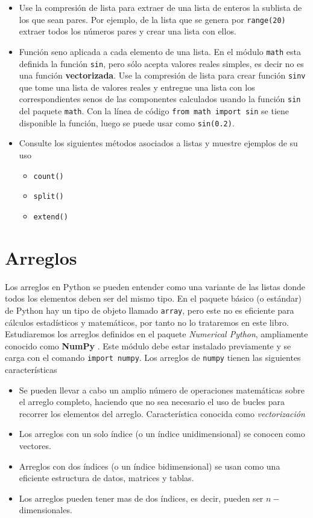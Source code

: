 \documentclass[
]{book}
\providecommand{\tightlist}{%
  \setlength{\itemsep}{0pt}\setlength{\parskip}{0pt}}
\theoremstyle{definition}
\theoremstyle{definition}
\theoremstyle{definition}
\theoremstyle{definition}
\theoremstyle{remark}
\begin{document}
\begin{itemize}
\item
  Use la compresión de lista para extraer de una lista de enteros la sublista de los que sean pares. Por ejemplo, de la lista que se genera por \texttt{range(20)} extraer todos los números pares y crear una lista con ellos.
\item
  Función seno aplicada a cada elemento de una lista. En el módulo \texttt{math} esta definida la función \texttt{sin}, pero sólo acepta valores reales simples, es decir no es una función \textbf{vectorizada}. Use la compresión de lista para crear función \texttt{sinv} que tome una lista de valores reales y entregue una lista con los correspondientes senos de las componentes calculados usando la función \texttt{sin} del paquete \texttt{math}. Con la línea de código \texttt{from\ math\ import\ sin} se tiene disponible la función, luego se puede usar como \texttt{sin(0.2)}.
\item
  Consulte los siguientes métodos asociados a listas y muestre ejemplos de su uso

  \begin{itemize}
  \tightlist
  \item
    \texttt{count()}
  \item
    \texttt{split()}
  \item
    \texttt{extend()}
  \end{itemize}
\end{itemize}

\hypertarget{sec:arreglos}{%
\section{Arreglos}\label{sec:arreglos}}

Los arreglos en Python se pueden entender como una variante de las listas donde todos los elementos deben ser del mismo tipo. En el paquete básico (o estándar) de Python hay un tipo de objeto llamado \texttt{array}, pero este no es eficiente para cálculos estadísticos y matemáticos, por tanto no lo trataremos en este libro. Estudiaremos los arreglos definidos en el paquete \emph{Numerical Python}, ampliamente conocido como \textbf{NumPy} \citep{harris2020array}. Este módulo debe estar instalado previamente y se carga con el comando \texttt{import\ numpy}. Los arreglos de \texttt{numpy} tienen las siguientes características

\begin{itemize}
\tightlist
\item
  Se pueden llevar a cabo un amplio número de operaciones matemáticas sobre el arreglo completo, haciendo que no sea necesario el uso de bucles para recorrer los elementos del arreglo. Característica conocida como \emph{vectorización}
\item
  Los arreglos con un solo índice (o un índice unidimensional) se conocen como vectores.
\item
  Arreglos con dos índices (o un índice bidimensional) se usan como una eficiente estructura de datos, matrices y tablas.
\item
  Los arreglos pueden tener mas de dos índices, es decir, pueden ser \(n-\)dimensionales.
\end{itemize}
\end{document}
